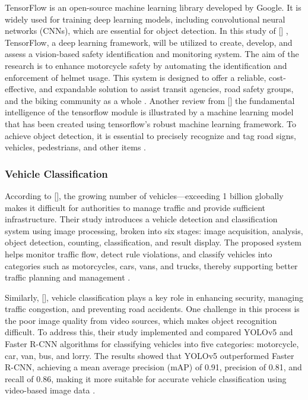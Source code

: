 \begin{refsection}
TensorFlow is an open-source machine learning library developed by Google. It is widely used for training deep learning models, including convolutional neural networks (CNNs), which are essential for object detection. In this study of \citeauthor{kumar2023vision} [\citeyear{kumar2023vision}] , TensorFlow, a deep learning framework, will be utilized to create, develop, and assess a vision-based safety identification and monitoring system. The aim of the research is to enhance motorcycle safety by automating the identification and enforcement of helmet usage. This system is designed to offer a reliable, cost-effective, and expandable solution to assist transit agencies, road safety groups, and the biking community as a whole \cite{kumar2023vision}. Another review from \citeauthor{sharma2024vision} [\citeyear{sharma2024vision}] the fundamental intelligence of the tensorflow module is illustrated by a machine learning model that has been created using tensorflow's robust machine learning framework. To achieve object detection, it is essential to precisely recognize and tag road signs, vehicles, pedestrians, and other items \cite{sharma2024vision}.  

\subsubsection{Vehicle Classification}
    According to \citeauthor{chandrika2020vehicle} [\citeyear{chandrika2020vehicle}], the growing number of vehicles—exceeding 1 billion globally makes it difficult for authorities to manage traffic and provide sufficient infrastructure. Their study introduces a vehicle detection and classification system using image processing, broken into six stages: image acquisition, analysis, object detection, counting, classification, and result display. The proposed system helps monitor traffic flow, detect rule violations, and classify vehicles into categories such as motorcycles, cars, vans, and trucks, thereby supporting better traffic planning and management \cite{chandrika2020vehicle}.

Similarly, \citeauthor{ong2022vehicle} [\citeyear{ong2022vehicle}], vehicle classification plays a key role in enhancing security, managing traffic congestion, and preventing road accidents. One challenge in this process is the poor image quality from video sources, which makes object recognition difficult. To address this, their study implemented and compared YOLOv5 and Faster R-CNN algorithms for classifying vehicles into five categories: motorcycle, car, van, bus, and lorry. The results showed that YOLOv5 outperformed Faster R-CNN, achieving a mean average precision (mAP) of 0.91, precision of 0.81, and recall of 0.86, making it more suitable for accurate vehicle classification using video-based image data \cite{ong2022vehicle}.


\end{refsection}
